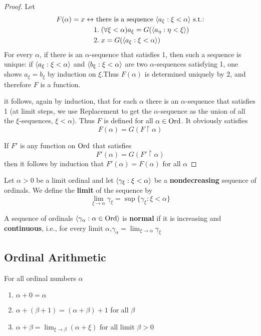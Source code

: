 \documentclass[11pt]{article}
\begin{document}
\begin{proof}
Let
\begin{align}
\label{2.6}
F(\alpha)=x\leftrightarrow&\text{ there is a sequence }\langle a_\xi:\xi<\alpha\rangle\text{ s.t.:}\\
&1.\; (\forall\xi<\alpha)a_\xi=G(\langle a_\eta:\eta<\xi\rangle)\nonumber\\
&2.\; x=G(\langle a_\xi:\xi<\alpha\rangle)\nonumber
\end{align}
For every \(\alpha\), if there is an \(\alpha\)-sequence that satisfies 1, then such a sequence is unique:
if \(\langle a_\xi:\xi<\alpha\rangle\) and \(\langle b_\xi:\xi<\alpha\rangle\) are two \(\alpha\)-sequences satisfying 1, one shows \(a_\xi=b_\xi\) by
induction on \(\xi\).Thus \(F(\alpha)\) is determined uniquely by 2, and therefore \(F\) is a function.

it follows, again by induction, that for each \(\alpha\) there is an \(\alpha\)-sequence that satisfies 1 (at
limit steps, we use Replacement to get the \(\alpha\)-sequence as the union of all the
\(\xi\)-sequences, \(\xi<\alpha\)). Thus \(F\) is defined for all \(\alpha\in\text{Ord}\). It obviously satisfies
\begin{equation*}
F(\alpha)=G(F\restriction\alpha)
\end{equation*}

If \(F'\) is any function on \(\text{Ord}\) that satisfies
\begin{equation*}
F'(\alpha)=G(F'\restriction\alpha)
\end{equation*}
then it follows by induction that \(F'(\alpha)=F(\alpha)\) for all \(\alpha\)
\end{proof}

\begin{definition}[]
Let \(\alpha>0\) be a limit ordinal and let \(\langle\gamma_\xi:\xi<\alpha\rangle\) be a \textbf{nondecreasing} sequence of ordinals.
We define the \textbf{limit} of the sequence by
\begin{equation*}
\lim_{\xi\to\alpha}\gamma_\xi=\sup\{\gamma_\xi:\xi<\alpha\}
\end{equation*}

A sequence of ordinals \(\langle\gamma_\alpha:\alpha\in\text{Ord}\rangle\) is \textbf{normal} if it is increasing and \textbf{continuous}, i.e., for
every limit \(\alpha\),\(\gamma_\alpha=\lim_{\xi\to\alpha}\gamma_\xi\)
\end{definition}

\subsection{Ordinal Arithmetic}
\label{sec:orgf9f662b}
\begin{definition}[Addition]
For all ordinal numbers \(\alpha\)
\begin{enumerate}
\item \(\alpha+0=\alpha\)
\item \(\alpha+(\beta+1)=(\alpha+\beta)+1\) for all \(\beta\)
\item \(\alpha+\beta=\lim_{\xi\to\beta}(\alpha+\xi)\) for all limit \(\beta>0\)
\end{enumerate}
\end{definition}
\end{document}
